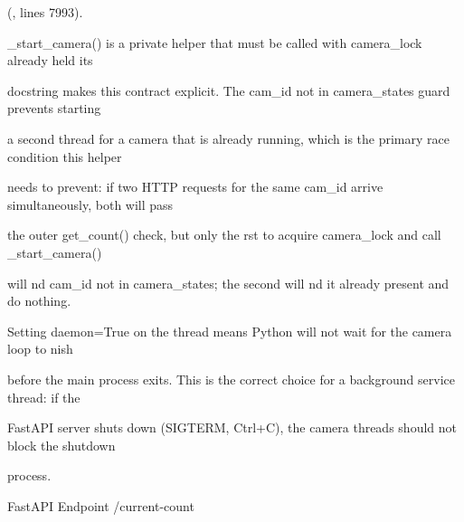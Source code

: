 (, lines 7993).

\_start\_camera() is a private helper that must be called with camera\_lock already held  its

docstring makes this contract explicit. The cam\_id not in camera\_states guard prevents starting

a second thread for a camera that is already running, which is the primary race condition this helper

needs to prevent: if two HTTP requests for the same cam\_id arrive simultaneously, both will pass

the outer get\_count() check, but only the rst to acquire camera\_lock and call \_start\_camera()

will nd cam\_id not in camera\_states; the second will nd it already present and do nothing.

Setting daemon=True on the thread means Python will not wait for the camera loop to nish

before the main process exits. This is the correct choice for a background service thread: if the

FastAPI server shuts down (SIGTERM, Ctrl+C), the camera threads should not block the shutdown

process.

FastAPI Endpoint  /current-count

